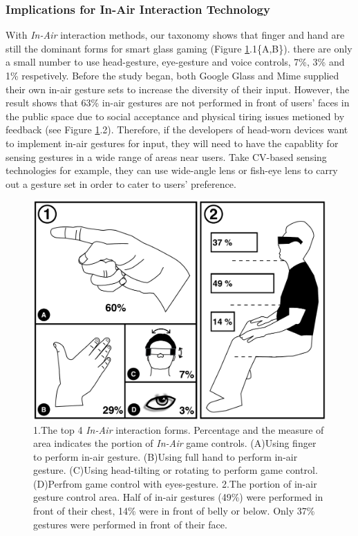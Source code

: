 \documentclass{sigchi}
\begin{document}
    \subsubsection{Implications for In-Air Interaction Technology}
    With \emph{In-Air} interaction methods, our taxonomy shows that finger and hand are still the dominant  forms for smart glass gaming (Figure \ref{fig:figureInAirPorpotion}.1\{A,B\}). there are only a small number to use head-gesture, eye-gesture and voice controls, 7\%, 3\% and 1\% respetively.
    Before the study began, both Google Glass and Mime\cite{GoogleGlass, Colaco:2013:MCL:2501988.2502042} supplied their own in-air gesture sets to increase the diversity of their input. However, the result shows that 63\% in-air gestures are not performed in front of users' faces in the public space due to social acceptance and physical tiring issues metioned by feedback (see Figure \ref{fig:figureInAirPorpotion}.2). Therefore, if the developers of head-worn devices want to implement in-air gestures for input, they will need to have the capablity for sensing gestures in a wide range of areas near users. Take CV-based sensing technologies for example, they can use wide-angle lens or fish-eye lens to carry out a gesture set in order to cater to users' preference.   
  \begin{figure}[!h]
  \centering
  \includegraphics[width=1\columnwidth]{InAirControlArea.pdf}
  \caption{1.The top 4 \emph{In-Air} interaction forms. Percentage and the measure of area indicates the portion of \emph{In-Air} game controls. (A)Using finger to perform in-air gesture. (B)Using full hand to perform in-air gesture. (C)Using head-tilting or rotating to perform game control. (D)Perfrom game control with eyes-gesture. 2.The portion of in-air gesture control area. Half of in-air gestures (49\%) were performed in front of their chest, 14\% were in front of belly or below. Only 37\% gestures were performed in front of their face.}
  \label{fig:figureInAirPorpotion}
  \end{figure}
\end{document}
